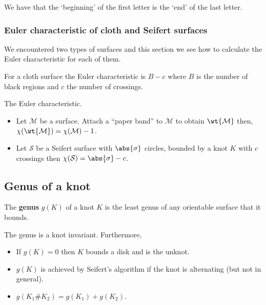\documentclass[12pt, a4paper]{article}
\begin{document}
\begin{mdnote}
    We have that the `beginning' of the first letter is the `end' of the last letter.
\end{mdnote}

\subsubsection{Euler characteristic of cloth and Seifert surfaces}

\begin{mdnote}
    We encountered two types of surfaces and this section we see how to calculate the Euler characteristic for each of them.
\end{mdnote}

\begin{mdprop}
    For a cloth surface the Euler characteristic is \(B-c\) where \(B\) is the number of black regions and \(c\) the number of crossings.
\end{mdprop}

\begin{mdprop}
    The Euler characteristic.
    \begin{itemize}
        \item Let \(\mathcal{M}\) be a surface. Attach a ``paper band'' to \(\mathcal{M}\) to obtain \(\wt{\mathcal{M}}\) then, \(\chi(\wt{\mathcal{M}})=\chi(\mathcal{M})-1\).
        \item Let \(\mathcal{S}\) be a Seifert surface with \(\abs{\sigma}\) circles, bounded by a knot \(K\) with \(c\) crossings then \(\chi(\mathcal{S})=\abs{\sigma}-c\).
    \end{itemize}
\end{mdprop}

\subsection{Genus of a knot}

\begin{definition}
    The \textbf{genus} \(g(K)\) of a knot \(K\) is the least genus of any orientable surface that it bounds.
\end{definition}

\begin{mdprop}
    The genus is a knot invariant. Furthermore,
    \begin{itemize}
        \item If \(g(K)=0\) then \(K\) bounds a disk and is the unknot.
        \item \(g(K)\) is achieved by Seifert's algorithm if the knot is alternating (but not in general).
        \item \(g(K_1 \# K_2)=g(K_1)+g(K_2)\).
    \end{itemize}
\end{mdprop}
\end{document}
